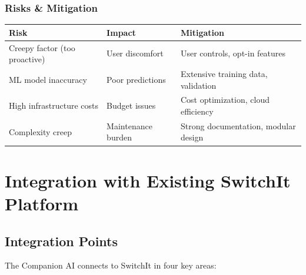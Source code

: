 \documentclass[12pt,a4paper]{article}
\begin{document}
\subsubsection{Risks \& Mitigation}

\begin{table}[h]
\centering
\begin{tabularx}{\textwidth}{|l|X|X|}
\hline
\textbf{Risk} & \textbf{Impact} & \textbf{Mitigation} \\
\hline
Creepy factor (too proactive) & User discomfort & User controls, opt-in features \\
\hline
ML model inaccuracy & Poor predictions & Extensive training data, validation \\
\hline
High infrastructure costs & Budget issues & Cost optimization, cloud efficiency \\
\hline
Complexity creep & Maintenance burden & Strong documentation, modular design \\
\hline
\end{tabularx}
\end{table}

\section{Integration with Existing SwitchIt Platform}

\subsection{Integration Points}

The Companion AI connects to SwitchIt in four key areas:
\end{document}
